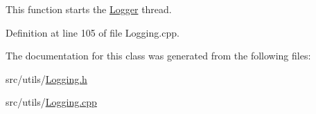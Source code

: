 This function starts the \mbox{\hyperlink{class_world_architect_1_1_logger}{Logger}} thread. 



Definition at line 105 of file Logging.\+cpp.



The documentation for this class was generated from the following files\+:\begin{DoxyCompactItemize}
\item 
src/utils/\mbox{\hyperlink{_logging_8h}{Logging.\+h}}\item 
src/utils/\mbox{\hyperlink{_logging_8cpp}{Logging.\+cpp}}\end{DoxyCompactItemize}
